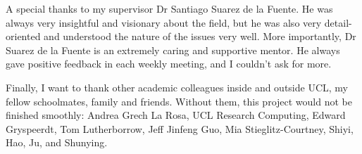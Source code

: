 

A special thanks to my supervisor Dr Santiago Suarez de la Fuente. He was always very insightful and visionary about the field, but he was also very detail-oriented and understood the nature of the issues very well. More importantly, Dr Suarez de la Fuente is an extremely caring and supportive mentor. He always gave positive feedback in each weekly meeting, and I couldn't ask for more.

Finally, I want to thank other academic colleagues inside and outside UCL, my fellow schoolmates, family and friends. Without them, this project would not be finished smoothly: Andrea Grech La Rosa, UCL Research Computing, Edward Gryspeerdt, Tom Lutherborrow, Jeff Jinfeng Guo, Mia Stieglitz-Courtney, Shiyi, Hao, Ju, and Shunying.
